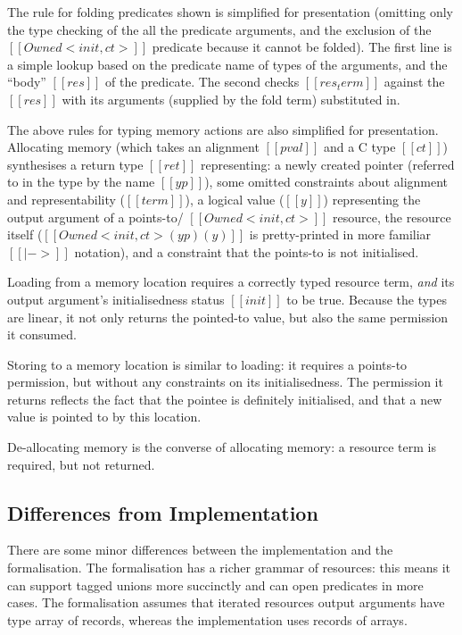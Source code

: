 \documentclass[11pt]{article}%
\begin{document}
The rule for folding predicates shown is simplified for presentation (omitting
only the type checking of the all the predicate arguments, and the exclusion of
the $[[ Owned < init , ct > ]]$ predicate because it cannot be folded). The first line
is a simple lookup based on the predicate name of types of the arguments, and
the ``body'' $[[ res ]]$ of the predicate. The second checks $[[ res_term ]]$
against the $[[ res ]]$ with its arguments (supplied by the fold term)
substituted in.

The above rules for typing memory actions are also simplified for
presentation.  Allocating memory (which takes an alignment $[[ pval ]]$ and a C
type $[[ ct ]]$) synthesises a return type $[[ ret ]]$ representing: a newly
created pointer (referred to in the type by the name $[[ yp ]]$), some omitted
constraints about alignment and representability ($[[ term ]]$), a logical
value ($[[ y ]]$) representing the output argument of a points-to/
$[[ Owned< init , ct > ]]$ resource, the resource itself
($[[ Owned <init , ct> ( yp ) ( y ) ]]$ is pretty-printed in more familiar $[[ |-> ]]$
notation), and a constraint that the points-to is not initialised.

Loading from a memory location requires a correctly typed resource term,
\emph{and} its output argument's initialisedness status $[[ init ]]$ to be
true. Because the types are linear, it not only returns the pointed-to value,
but also the same permission it consumed.

Storing to a memory location is similar to loading: it requires a points-to permission,
but without any constraints on its initialisedness. The permission it returns
reflects the fact that the pointee is definitely initialised, and that a new
value is pointed to by this location.

De-allocating memory is the converse of allocating memory: a resource term is
required, but not returned.

\subsection{Differences from Implementation}

There are some minor differences between the implementation and the
formalisation. The formalisation has a richer grammar of resources:
this means it can support tagged unions more succinctly and can open
predicates in more cases. The formalisation assumes that iterated
resources output arguments have type array of records, whereas the
implementation uses records of arrays.
\end{document}
